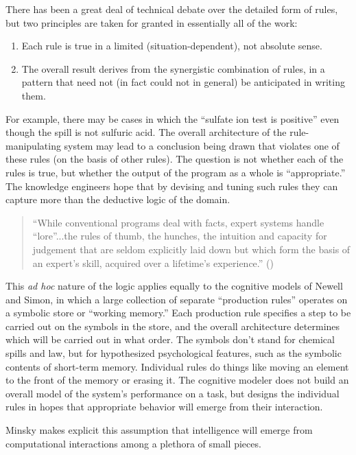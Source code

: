 \documentclass[12pt]{article}
\def\bq{\begin{quote}}
\def\eq{\end{quote}}
\begin{document}
There has been a great deal of technical debate over the detailed form of rules, but two principles are taken for granted in essentially all of the work:

\begin{enumerate}
\item Each rule is true in a limited (situation-dependent), not absolute sense. 

\item The overall result derives from the synergistic combination of rules, in a pattern that need not (in fact could not in general) be anticipated in writing them.

\end{enumerate}

For example, there may be cases in which the ``sulfate ion test is positive'' even though the spill is not sulfuric acid. The overall architecture of the rule-manipulating system may lead to a conclusion being drawn that violates one of these rules (on the basis of other rules). The question is not whether each of the rules is true, but whether the output of the program as a whole is ``appropriate.'' The knowledge engineers hope that by devising and tuning such rules they can capture more than the deductive logic of the domain.

\bq
``While conventional programs deal with facts, expert systems handle ``lore''...the rules of thumb, the hunches, the intuition and capacity
for judgement that are seldom explicitly laid down but which form the basis of an expert's skill, acquired over a lifetime's experience.'' ({\it \cite{michie1984}})
\eq

This {\it ad hoc} nature of the logic applies equally to the cognitive models of Newell and Simon, in which a large collection of separate ``production rules'' operates on a symbolic store or ``working memory.'' Each production rule specifies a step to be carried out on the symbols in the store, and the overall architecture determines which will be carried out in what order. The symbols don't stand for chemical spills and law, but for hypothesized psychological features, such as the symbolic contents of short-term memory. Individual rules do things like moving an element to the front of the memory or erasing it. The cognitive modeler does not build an overall model of the system's performance on a task, but designs the individual rules in hopes that appropriate behavior will emerge from their interaction.

Minsky makes explicit this assumption that intelligence will emerge from computational interactions among a plethora of small pieces.
\end{document}
